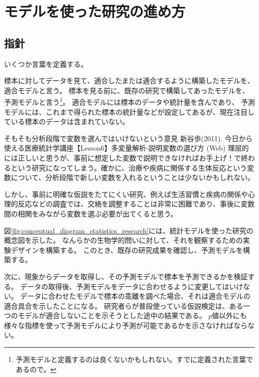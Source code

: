 \chapter{モデルを使った研究の進め方}

\section{指針}
いくつか言葉を定義する。
\begin{defi}
    標本に対してデータを見て、適合したまたは適合するように構築したモデルを、適合モデルと言う。
    標本を見る前に、既存の研究で構築してあったモデルを、予測モデルと言う\footnote{予測モデルと定義するのは良くないかもしれない。すでに定義された言葉であるので。}。
    適合モデルには標本のデータや統計量を含んであり、
    予測モデルには、これまで得られた標本の統計量などが設定してあるが、現在注目している標本のデータは含まれていない。
\end{defi}

そもそも分析段階で変数を選んではいけないという意見
新谷歩(2011). 今日から使える医療統計学講座【Lesson6】多変量解析-説明変数の選び方 (Web)
理屈的には正しいと思うが、事前に想定した変数で説明できなければお手上げ！で終わるという研究になってしまう。確かに、治療や疾病に関係する生体反応という変数について、分析段階で新しい変数を入れるということは少ないかもしれない。

しかし、事前に明確な仮説をたてにくい研究、例えば生活習慣と疾病の関係や心理的反応などの調査では、交絡を調整することは非常に困難であり、事後に変数間の相関をみながら変数を選ぶ必要が出てくると思う。
\fi


図\ref{fig:conceptual_diagram_statistics_research}には、統計モデルを使った研究の概念図を示した。
なんらかの生物学的問いに対して、それを観察するための実験デザインを構築する。
このとき、既存の研究成果を確認し、予測モデルを構築する。

次に、現象からデータを取得し、その予測モデルで標本を予測できるかを検証する。
データの取得後、予測モデルをデータに合わせるように変更してはいけない。
データに合わせたモデルで標本の乖離を調べた場合、それは適合モデルの適合具合を示したことになる。
研究者らが普段使っている仮説検定は、ある一つのモデルが適合しないことを示そうとした途中の結果である。
$p$値以外にも様々な指標を使って予測モデルにより予測が可能であるかを示さなければならない。

